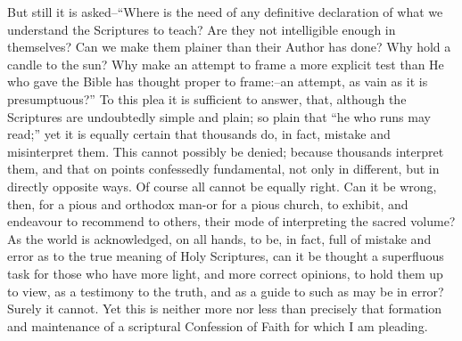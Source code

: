 \documentclass[
]{book}
\begin{document}
But still it is asked--``Where is the need of any definitive declaration of what we understand the Scriptures to teach? Are they not intelligible enough in themselves? Can we make them plainer than their Author has done? Why hold a candle to the sun? Why make an attempt to frame a more explicit test than He who gave the Bible has thought proper to frame:--an attempt, as vain as it is presumptuous?'' To this plea it is sufficient to answer, that, although the Scriptures are undoubtedly simple and plain; so plain that ``he who runs may read;'' yet it is equally certain that thousands do, in fact, mistake and misinterpret them. This cannot possibly be denied; because thousands interpret them, and that on points confessedly fundamental, not only in different, but in directly opposite ways. Of course all cannot be equally right. Can it be wrong, then, for a pious and orthodox man-or for a pious church, to exhibit, and endeavour to recommend to others, their mode of interpreting the sacred volume? As the world is acknowledged, on all hands, to be, in fact, full of mistake and error as to the true meaning of Holy Scriptures, can it be thought a superfluous task for those who have more light, and more correct opinions, to hold them up to view, as a testimony to the truth, and as a guide to such as may be in error? Surely it cannot. Yet this is neither more nor less than precisely that formation and maintenance of a scriptural Confession of Faith for which I am pleading.
\end{document}

